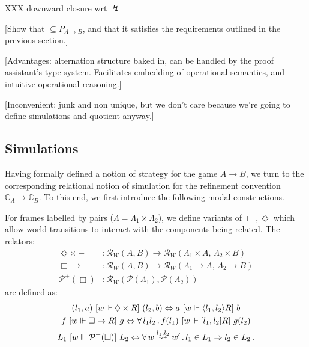 XXX downward closure wrt $\lightning$

[Show that $\subseteq P_{A \rightarrow B}$,
and that it satisfies the requirements outlined
in the previous section.]

[Advantages: alternation structure baked in,
can be handled by the proof assistant's type system.
Facilitates embedding of operational semantics,
and intuitive operational reasoning.]

[Inconvenient: junk and non unique,
but we don't care because we're going to
define simulations and quotient anyway.]



\subsection{Simulations} %
\label{sec:sim}

Having formally defined a notion of strategy
for the game $A \rightarrow B$,
we turn to the corresponding relational notion of simulation
for the refinement convention $\mathbb{C}_A \rightarrow \mathbb{C}_B$.
To this end,
we first introduce the following modal constructions.

\begin{definition} %
For frames labelled by pairs
($\Lambda = \Lambda_1 \times \Lambda_2$),
we define variants of $\Box, \Diamond$ which
allow world transitions to interact with the components
being related.
The relators:
\begin{align*}
  \Diamond \times {-} &: \mathcal{R}_W(A, B) \rightarrow
              \mathcal{R}_W(\Lambda_1 \times A, \, \Lambda_2 \times B) \\
  \Box \rightarrow - &: \mathcal{R}_W(A, B) \rightarrow
          \mathcal{R}_W(\Lambda_1 \rightarrow A, \, \Lambda_2 \rightarrow B) \\
  \mathcal{P}^+(\Box) &:
      \mathcal{R}_W(\mathcal{P}(\Lambda_1), \mathcal{P}(\Lambda_2))
\end{align*}
are defined as:
\begin{gather*}
  (l_1, a) \ [{w \Vdash \Diamond \times R}]\  (l_2, b) \Leftrightarrow
    a \ [{w \Vdash \langle l_1, l_2 \rangle R}]\  b \\
  f \ [{w \Vdash \Box \rightarrow R}]\  g \Leftrightarrow
    \forall \, l_1 l_2 \,.\, f(l_1) \ [{w \Vdash [l_1, l_2] R}]\  g(l_2) \\
  L_1 \ [{w \Vdash \mathcal{P}^+(\Box)}]\  L_2 \Leftrightarrow
    \forall \, w \stackrel{l_1, l_2}{\leadsto} w' \,.\,
      l_1 \in L_1 \Rightarrow l_2 \in L_2 \,.
\end{gather*}
\end{definition}

